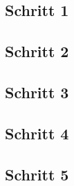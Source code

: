 


\clearpage
\subsection{Schritt 1}


\clearpage
\subsection{Schritt 2}


\clearpage
\subsection{Schritt 3}



\clearpage
\subsection{Schritt 4}


\clearpage
\subsection{Schritt 5}
